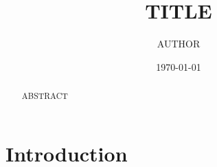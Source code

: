 \documentclass[10pt,a4paper]{amsart}
\begin{document}

\title{{{TITLE}}}
\author{{{AUTHOR}}}
\address{}
\date{\today}

\begin{abstract}
{{ABSTRACT}}
\end{abstract}

\maketitle
\tableofcontents

\section{Introduction}\label{sec:intro}



\printbibliography
\end{document}
